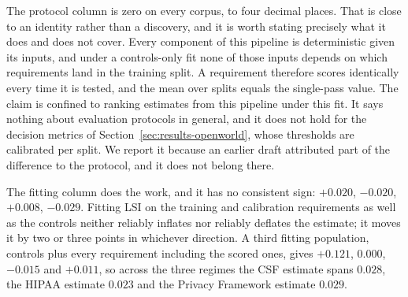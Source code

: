 \documentclass[smallextended,natbib]{svjour3}
\begin{document}
\begin{table}[htbp]
\caption{Separating the evaluation protocol from the LSI fitting population. Cell~A is repeated holdouts with LSI fitted on controls only; cell~B is repeated holdouts with LSI fitted on controls plus the training and calibration requirements, which is what the earlier version of this work used; cell~C is the primary one-pass protocol with LSI fitted on controls only. A~vs.~B isolates the fitting population, A~vs.~C isolates the protocol. Unplanned analysis.}
\label{tab:lsi}
\centering
\setlength{\tabcolsep}{3pt}
\small
{}
\end{table}

The protocol column is zero on every corpus, to four decimal places. That is close to an identity rather than a discovery, and it is worth stating precisely what it does and does not cover. Every component of this pipeline is deterministic given its inputs, and under a controls-only fit none of those inputs depends on which requirements land in the training split. A requirement therefore scores identically every time it is tested, and the mean over splits equals the single-pass value. The claim is confined to ranking estimates from this pipeline under this fit. It says nothing about evaluation protocols in general, and it does not hold for the decision metrics of Section~\ref{sec:results-openworld}, whose thresholds are calibrated per split. We report it because an earlier draft attributed part of the difference to the protocol, and it does not belong there.

The fitting column does the work, and it has no consistent sign: $+0.020$, $-0.020$, $+0.008$, $-0.029$. Fitting LSI on the training and calibration requirements as well as the controls neither reliably inflates nor reliably deflates the estimate; it moves it by two or three points in whichever direction. A third fitting population, controls plus every requirement including the scored ones, gives $+0.121$, $0.000$, $-0.015$ and $+0.011$, so across the three regimes the CSF estimate spans $0.028$, the HIPAA estimate $0.023$ and the Privacy Framework estimate $0.029$.
\end{document}
